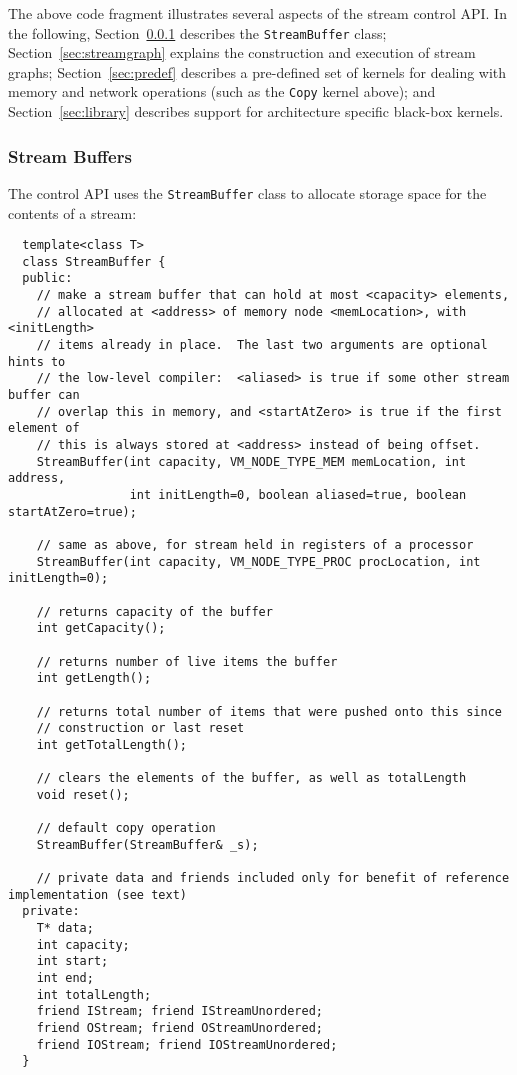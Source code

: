 The above code fragment illustrates several aspects of the stream
control API.  In the following, Section~\ref{sec:procstreams}
describes the {\tt StreamBuffer} class; Section~\ref{sec:streamgraph}
explains the construction and execution of stream graphs;
Section~\ref{sec:predef} describes a pre-defined set of kernels for
dealing with memory and network operations (such as the {\tt Copy}
kernel above); and Section~\ref{sec:library} describes support for
architecture specific black-box kernels.

\subsubsection{Stream Buffers}
\label{sec:procstreams}

The control API uses the {\tt StreamBuffer} class to allocate storage
space for the contents of a stream:
{\small
\begin{verbatim}
  template<class T>
  class StreamBuffer {
  public:
    // make a stream buffer that can hold at most <capacity> elements,
    // allocated at <address> of memory node <memLocation>, with <initLength>
    // items already in place.  The last two arguments are optional hints to
    // the low-level compiler:  <aliased> is true if some other stream buffer can
    // overlap this in memory, and <startAtZero> is true if the first element of
    // this is always stored at <address> instead of being offset.
    StreamBuffer(int capacity, VM_NODE_TYPE_MEM memLocation, int address, 
                 int initLength=0, boolean aliased=true, boolean startAtZero=true);

    // same as above, for stream held in registers of a processor
    StreamBuffer(int capacity, VM_NODE_TYPE_PROC procLocation, int initLength=0);

    // returns capacity of the buffer
    int getCapacity();

    // returns number of live items the buffer
    int getLength();

    // returns total number of items that were pushed onto this since
    // construction or last reset
    int getTotalLength();

    // clears the elements of the buffer, as well as totalLength
    void reset();

    // default copy operation
    StreamBuffer(StreamBuffer& _s);

    // private data and friends included only for benefit of reference implementation (see text)
  private:
    T* data;
    int capacity;
    int start;
    int end;
    int totalLength;
    friend IStream; friend IStreamUnordered;
    friend OStream; friend OStreamUnordered;
    friend IOStream; friend IOStreamUnordered;
  }
\end{verbatim}}

